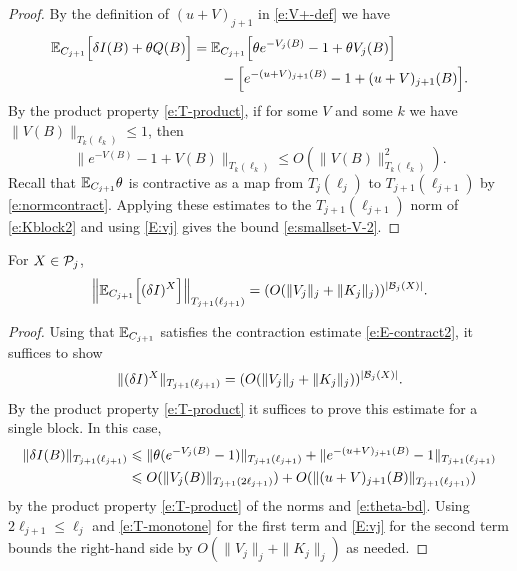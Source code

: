 \documentclass[11pt]{amsart}
\numberwithin{equation}{section}
\numberwithin{theorem}{section}
\newcommand{\1}{{\bf 1}}
\begin{document}
\begin{proof}
By the definition of $(u+V)_{j+1}$ in \eqref{e:V+-def} we have
\begin{align} \label{e:Kblock2}
  \mathbb{E}_{C_{j+1}}\Bigl[{\delta I(B)+\theta Q(B)}\Bigr]
  &=  \mathbb{E}_{C_{j+1}}\Bigl[{\theta e^{-V_j(B)}-1 +  \theta V_j(B)}\Bigr]
    \nonumber\\
    &\qquad - \Bigl[{e^{-(u+V)_{j+1}(B)}-1+ (u+V)_{j+1}(B)}\Bigr].
\end{align}
By the product property \eqref{e:T-product}, if for some $V$ and some $k$ we have $\|V(B)\|_{T_k(\ell_k)} \leq 1$, then 
\begin{equation}
  \|e^{-V(B)}-1+V(B)\|_{T_k(\ell_k)} \leq O(\|V(B)\|_{T_k(\ell_k)}^2).
\end{equation}
Recall that $\mathbb{E}_{C_{j+1}}\theta$ is contractive as a map from
$T_{j}(\ell_{j})$ to $T_{j+1}(\ell_{j+1})$ by \eqref{e:normcontract}. 
Applying these estimates to the $T_{j+1}(\ell_{j+1})$ norm of
\eqref{e:Kblock2} and using \eqref{E:vj} gives the bound
\eqref{e:smallset-V-2}.
\end{proof}

\begin{lemma}\label{lem:smallset-V1}
  For $X \in \mathcal P_j$,
  \begin{equation}
        \label{e:smallset-V-1}
        \Bigl\lVert \mathbb{E}_{C_{j+1}} \Bigl[{(\delta I)^X}\Bigr] \Bigr\rVert_{T_{j+1}(\ell_{j+1})}
        = (O(\|V_j\|_j+\|K_j\|_j))^{|\mathcal B_j(X)|}.
  \end{equation}
\end{lemma}

\begin{proof}
  Using that $\mathbb{E}_{C_{j+1}}$ satisfies the contraction estimate \eqref{e:E-contract2},
  it suffices to show
  \begin{equation} \label{e:deltaIbd}
    \|(\delta I)^X\|_{T_{j+1}(\ell_{j+1})} 
    = (O(\|V_j\|_j+\|K_j\|_j))^{|\mathcal B_j(X)|}.
  \end{equation}
  By the product property \eqref{e:T-product} it suffices to prove this estimate for a
  single block. In this case,
  \begin{align}
    \|\delta I(B)\|_{T_{j+1}(\ell_{j+1})} 
    &\leqslant
    \|\theta(e^{-V_j(B)}-1)\|_{T_{j+1}(\ell_{j+1})} 
    +
      \|e^{-(u+V)_{j+1}(B)}-1\|_{T_{j+1}(\ell_{j+1})}
      \nonumber\\
    &\leqslant
            O(\|V_j(B)\|_{T_{j+1}(2\ell_{j+1})})
    +
    O(\|(u+V)_{j+1}(B)\|_{T_{j+1}(\ell_{j+1})})
  \end{align}
  by the product property \eqref{e:T-product} of the norms 
  and \eqref{e:theta-bd}.
  Using $2\ell_{j+1} \leq \ell_j$ and \eqref{e:T-monotone} for the first term
  and \eqref{E:vj} for the second term bounds 
  the right-hand side by $O(\|V_j\|_j + \|K_j\|_j)$ as needed.
\end{proof}
\end{document}
